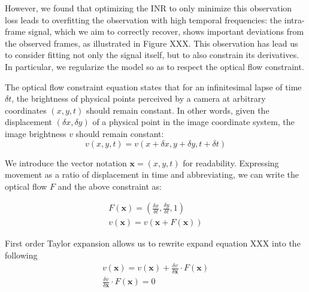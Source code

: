 \documentclass{article}
\begin{document}
However, we found that optimizing the INR to only minimize this observation loss leads to overfitting the observation with high temporal frequencies:
the intra-frame signal, which we aim to correctly recover, shows important deviations from the observed frames, as illustrated in Figure XXX.
This observation has lead us to consider fitting not only the signal itself, but to also constrain its derivatives.
In particular, we regularize the model so as to respect the optical flow constraint.


The optical flow constraint equation states that for an infinitesimal lapse of time $\delta t$,
the brightness of physical points perceived by a camera at arbitrary coordinates $(x,y,t)$ should remain constant.
In other words, given the displacement $(\delta x, \delta y)$ of a physical point in the image coordinate system,
the image brightness $v$ should remain constant:
\begin{equation}
v(x, y, t)=v(x + \delta x, y + \delta y, t + \delta t)
\end{equation}

We introduce the vector notation $\textbf{x}=(x,y,t)$ for readability.
Expressing movement as a ratio of displacement in time and abbreviating,
we can write the optical flow $F$ and the above constraint as:

\begin{equation}
\begin{aligned}
F(\textbf{x})=(\frac{\delta x}{\delta t}, \frac{\delta y}{\delta t}, 1) \\
v(\textbf{x})=v(\textbf{x} + F(\textbf{x}))
\end{aligned}
\end{equation}

First order Taylor expansion allows us to rewrite expand equation XXX into the following
\begin{equation}
\begin{aligned}
v(\textbf{x}) = v(\textbf{x}) + \frac{\delta v}{\delta \textbf{x}} \cdot F(\textbf{x}) \\
\frac{\delta v}{\delta \textbf{x}} \cdot F(\textbf{x}) =0
\end{aligned}
\end{equation}
\end{document}
